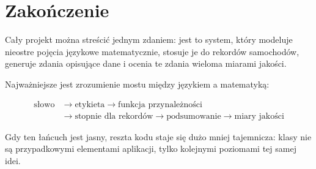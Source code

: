 \documentclass[11pt,a4paper]{article}
\begin{document}
\section*{Zakończenie}

Cały projekt można streścić jednym zdaniem: jest to system, który modeluje nieostre pojęcia językowe matematycznie, stosuje je do rekordów samochodów, generuje zdania opisujące dane i ocenia te zdania wieloma miarami jakości.

Najważniejsze jest zrozumienie mostu między językiem a matematyką:

\[
\begin{aligned}
\text{słowo} &\rightarrow \text{etykieta} \rightarrow \text{funkcja przynależności}\\
&\rightarrow \text{stopnie dla rekordów} \rightarrow \text{podsumowanie} \rightarrow \text{miary jakości}
\end{aligned}
\]

Gdy ten łańcuch jest jasny, reszta kodu staje się dużo mniej tajemnicza: klasy nie są przypadkowymi elementami aplikacji, tylko kolejnymi poziomami tej samej idei.
\end{document}

